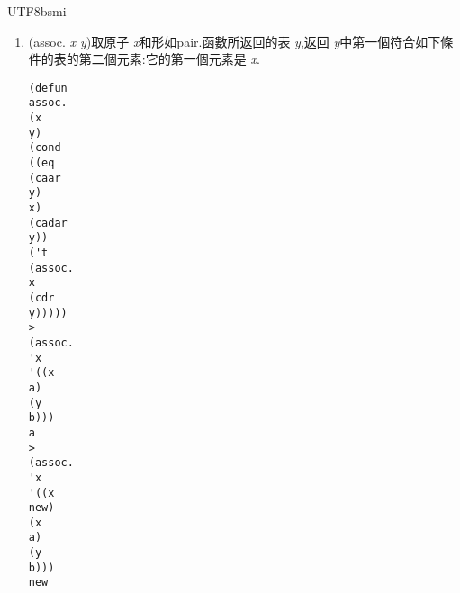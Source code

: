 \documentclass[12pt,a4]{article}
\begin{document}
\begin{CJK}{UTF8}{bsmi}
\begin{enumerate}
應位置的x,y的元素對. 
\begin{verbatim} 
(defun 
pair. 
(x 
y) 
(cond 
((and. 
(null. 
x) 
(null. 
y)) 
'()) 
((and. 
(not. 
(atom 
x)) 
(not. 
(atom 
y))) 
(cons 
(list 
(car 
x) 
(car 
y)) 
(pair. 
(cdr) 
(cdr 
y)))))) 
> 
(pair. 
'(x 
y 
z) 
'(a 
b 
c)) 
((x 
a) 
(y 
b) 
(z 
c)) 
\end{verbatim} 
\item 
(assoc. 
{\it 
x 
y})取原子{\it 
x}和形如pair.函數所返回的表{\it 
y},返回{\it 
y}中第一個符合如下條 
件的表的第二個元素:它的第一個元素是{\it 
x}. 
\begin{verbatim} 
(defun 
assoc. 
(x 
y) 
(cond 
((eq 
(caar 
y) 
x) 
(cadar 
y)) 
('t 
(assoc. 
x 
(cdr 
y))))) 
> 
(assoc. 
'x 
'((x 
a) 
(y 
b))) 
a 
> 
(assoc. 
'x 
'((x 
new) 
(x 
a) 
(y 
b))) 
new 
\end{verbatim} 
\end{enumerate} 

\end{CJK}
\end{document}

